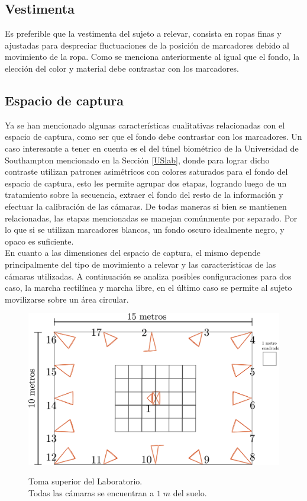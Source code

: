 \subsection{Vestimenta}
Es preferible que la vestimenta del sujeto a relevar, consista en ropas finas y ajustadas para despreciar fluctuaciones de la posición de marcadores debido al movimiento de la ropa. Como se menciona anteriormente al igual que el fondo, la elección del color y material debe contrastar con los marcadores.

\subsection{Espacio de captura}

Ya se han mencionado algunas características cualitativas relacionadas con el espacio de captura, como ser que el fondo debe contrastar con los marcadores. Un caso interesante a tener en cuenta es el del túnel biométrico de la Universidad de Southampton mencionado en la Sección \ref{USlab}, donde para lograr dicho contraste utilizan patrones asimétricos con colores saturados para el fondo del espacio de captura, esto les permite agrupar dos etapas, logrando luego de un tratamiento sobre la secuencia, extraer el fondo del resto de la información y efectuar la calibración de las cámaras. De todas maneras si bien se mantienen relacionadas, las etapas mencionadas se manejan comúnmente por separado. Por lo que si se utilizan marcadores blancos, un fondo oscuro idealmente negro, y opaco es suficiente.\\

En cuanto a las dimensiones del espacio de captura, el mismo depende principalmente del tipo de movimiento a relevar y las características de las cámaras utilizadas. A continuación se analiza posibles configuraciones para dos caso, la marcha rectilínea y marcha libre, en el último caso se permite al sujeto movilizarse sobre un área circular.


\begin{figure}[ht!]
  \centering
  {\includegraphics[scale=0.16]{img/Base_Datos/Laboratorio.pdf}}      
  \caption{Toma superior del Laboratorio.\\ Todas las cámaras se encuentran a $1\;m$ del suelo.}
  \label{img_Laboratorio}
\end{figure}  
 
